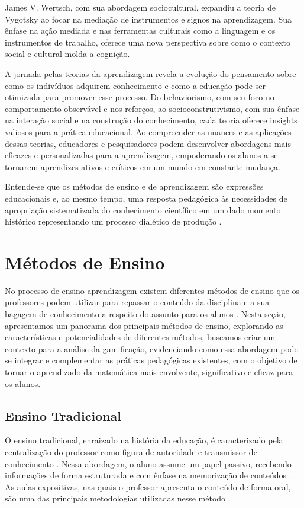 James V. Wertsch, com sua abordagem sociocultural, expandiu a teoria de Vygotsky ao focar na mediação de instrumentos e signos na aprendizagem. Sua ênfase na ação mediada e nas ferramentas culturais como a linguagem e os instrumentos de trabalho, oferece uma nova perspectiva sobre como o contexto social e cultural molda a cognição.

A jornada pelas teorias da aprendizagem revela a evolução do pensamento sobre como os indivíduos adquirem conhecimento e como a educação pode ser otimizada para promover esse processo. Do behaviorismo, com seu foco no comportamento observável e nos reforços, ao socioconstrutivismo, com sua ênfase na interação social e na construção do conhecimento, cada teoria oferece insights valiosos para a prática educacional. Ao compreender as nuances e as aplicações dessas teorias, educadores e pesquisadores podem desenvolver abordagens mais eficazes e personalizadas para a aprendizagem, empoderando os alunos a se tornarem aprendizes ativos e críticos em um mundo em constante mudança.

Entende-se que os métodos de ensino e de aprendizagem são expressões educacionais e, ao mesmo tempo, uma resposta pedagógica às necessidades de apropriação sistematizada do conhecimento científico em um dado momento histórico representando um processo dialético de produção \cite{lacanallo2007metodos}.

\section{Métodos de Ensino}
No processo de ensino-aprendizagem existem diferentes métodos de ensino que os professores podem utilizar para repassar o conteúdo da disciplina e a sua bagagem de conhecimento a respeito do assunto para os alunos \cite{kruger2013metodo}. Nesta seção, apresentamos um panorama dos principais métodos de ensino, explorando as características e potencialidades de diferentes métodos, buscamos criar um contexto para a análise da gamificação, evidenciando como essa abordagem pode se integrar e complementar as práticas pedagógicas existentes, com o objetivo de tornar o aprendizado da matemática mais envolvente, significativo e eficaz para os alunos.

\subsection{Ensino Tradicional}

O ensino tradicional, enraizado na história da educação, é caracterizado pela centralização do professor como figura de autoridade e transmissor de conhecimento \cite{kruger2013metodo}. Nessa abordagem, o aluno assume um papel passivo, recebendo informações de forma estruturada e com ênfase na memorização de conteúdos \cite{mezzari2011}. As aulas expositivas, nas quais o professor apresenta o conteúdo de forma oral, são uma das principais metodologias utilizadas nesse método \cite{weintraub2011}.

